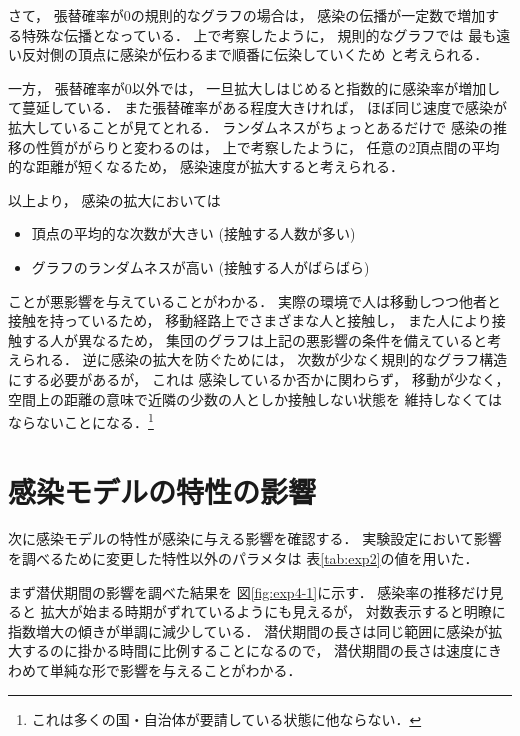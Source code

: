 \documentclass[10pt,oneside]{scrartcl}
\begin{document}
さて，
張替確率が0の規則的なグラフの場合は，
感染の伝播が一定数で増加する特殊な伝播となっている．
上で考察したように，
規則的なグラフでは
最も遠い反対側の頂点に感染が伝わるまで順番に伝染していくため
と考えられる．

一方，
張替確率が0以外では，
一旦拡大しはじめると指数的に感染率が増加して蔓延している．
また張替確率がある程度大きければ，
ほぼ同じ速度で感染が拡大していることが見てとれる．
ランダムネスがちょっとあるだけで
感染の推移の性質ががらりと変わるのは，
上で考察したように，
任意の2頂点間の平均的な距離が短くなるため，
感染速度が拡大すると考えられる．

\begin{figure*}%
  \centering
\end{figure*}

以上より，
感染の拡大においては
\begin{itemize}
\item 頂点の平均的な次数が大きい (接触する人数が多い)
\item グラフのランダムネスが高い (接触する人がばらばら)
\end{itemize}
ことが悪影響を与えていることがわかる．
実際の環境で人は移動しつつ他者と接触を持っているため，
移動経路上でさまざまな人と接触し，
また人により接触する人が異なるため，
集団のグラフは上記の悪影響の条件を備えていると考えられる．
逆に感染の拡大を防ぐためには，
次数が少なく規則的なグラフ構造にする必要があるが，
これは
感染しているか否かに関わらず，
移動が少なく，
空間上の距離の意味で近隣の少数の人としか接触しない状態を
維持しなくてはならないことになる．\footnote{これは多くの国・自治体が要請している状態に他ならない．}

\section{感染モデルの特性の影響}
\label{sec:orgacfb11c}

次に感染モデルの特性が感染に与える影響を確認する．
実験設定において影響を調べるために変更した特性以外のパラメタは
表\ref{tab:exp2}の値を用いた．

まず潜伏期間の影響を調べた結果を
図\ref{fig:exp4-1}に示す．
感染率の推移だけ見ると
拡大が始まる時期がずれているようにも見えるが，
対数表示すると明瞭に指数増大の傾きが単調に減少している．
潜伏期間の長さは同じ範囲に感染が拡大するのに掛かる時間に比例することになるので，
潜伏期間の長さは速度にきわめて単純な形で影響を与えることがわかる．
\end{document}

